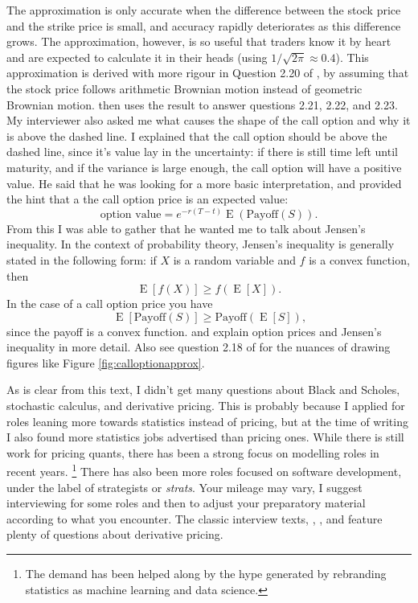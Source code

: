 \documentclass[11pt]{article}
\begin{document}
The approximation is only accurate when the difference between the stock price and the strike price is small, and accuracy rapidly deteriorates as this difference grows.
The approximation, however, is so useful that traders know it by heart and are expected to calculate it in their heads (using $1/\sqrt{2\pi} \approx 0.4$).
This approximation is derived with more rigour in Question 2.20 of \citet{HeardOnTheStreet}, by assuming that the stock price follows arithmetic Brownian motion instead of geometric Brownian motion.
\citet{HeardOnTheStreet} then uses the result to answer questions 2.21, 2.22, and 2.23.
My interviewer also asked me what causes the shape of the call option and why it is above the dashed line.
I explained that the call option should be above the dashed line, since it's value lay in the uncertainty: if there is still time left until maturity, and if the variance is large enough, the call option will have a positive value.
He said that he was looking for a more basic interpretation, and provided the hint that a the call option price is an expected value:
\begin{equation*}
\text{option value} = e^{-r(T-t)} \operatorname{E}\left( \text{Payoff}(S) \right)
\text{.}
\end{equation*}
From this I was able to gather that he wanted me to talk about Jensen's inequality.
In the context of probability theory, Jensen's inequality is generally stated in the following form: if $X$ is a random variable and $f$ is a convex function, then
\begin{equation*}
\operatorname{E}\left[ f(X) \right] \geq
f\left(\operatorname{E}\left[ X \right] \right)
\text{.}
\end{equation*}
In the case of a call option price you have
\begin{equation*}
 \operatorname{E}\left[ \text{Payoff}(S) \right] \geq
 \text{Payoff}\left(\operatorname{E}\left[ S \right]\right)
 \text{,}
\end{equation*}
since the payoff is a convex function.
\citet[chap.~2]{WilmottFAQ}
and
\citet[sec.~4.3]{wilmott2013intro}
explain option prices and Jensen's inequality in more detail.
Also see question 2.18 of
\cite{HeardOnTheStreet}
for the nuances of drawing figures like Figure \ref{fig:calloptionapprox}.


As is clear from this text, I didn't get many questions about Black and Scholes, stochastic calculus, and derivative pricing.
This is probably because I applied for roles leaning more towards statistics instead of pricing, but at the time of writing I also found more statistics jobs advertised than pricing ones.
While there is still work for pricing quants, there has been a strong focus on modelling roles in recent years.%
\footnote{The demand has been helped along by the hype generated by rebranding statistics as machine learning and data science.}
There has also been more roles focused on software development, under the label of strategists or \emph{strats}.
Your mileage may vary, I suggest interviewing for some roles and then to adjust your preparatory material according to what you encounter.
The classic interview texts,
\cite{HeardOnTheStreet},
\cite{WilmottFAQ}, and
\citet{JoshiQA}
feature plenty of questions about derivative pricing.




\end{document}
